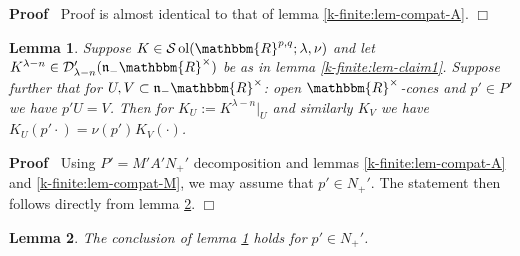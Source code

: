 \documentclass{article}
\newcommand{\assign}{:=}
\newcommand{\tmop}[1]{\ensuremath{\operatorname{#1}}}
\newenvironment{proof}{\noindent\textbf{Proof\ }}{\hspace*{\fill}$\Box$\medskip}
\numberwithin{definition}{section}
\newtheorem{lemma}{Lemma}
\numberwithin{lemma}{section}
\numberwithin{proposition}{section}
{\theorembodyfont{\rmfamily}\newtheorem{remark}{Remark}
\numberwithin{remark}{section}
}
\begin{document}
\begin{proof}
  Proof is almost identical to that of lemma \ref{k-finite:lem-compat-A}.
\end{proof}

\begin{lemma}
  \label{k-finite:lem-compat}Suppose $K_{} \in \mathcal{S} \tmop{ol} (
  \mathbbm{R}^{p, q} ; \lambda, \nu)$ and let $K^{\lambda - n} \in
  \mathcal{D}'_{\lambda - n} ( \mathfrak{n}_- \mathbbm{R}^{\times})$ be as in
  lemma \ref{k-finite:lem-claim1}. Suppose further that for $U, V \subset
  \mathfrak{n}_- \mathbbm{R}^{\times}$: open $\mathbbm{R}^{\times}$-cones and
  $p' \in P'$ we have $p' U = V$. Then for $K_U \assign K^{\lambda - n} |_U$
  and similarly $K_V$ we have $K_U ( p' \cdot) = \nu ( p')^{} K_V ( \cdot)$.
\end{lemma}

\begin{proof}
  Using $P' = M' A' N_+'$ decomposition and lemmas \ref{k-finite:lem-compat-A}
  and \ref{k-finite:lem-compat-M}, we may assume that $p' \in N_+'$. The
  statement then follows directly from lemma \ref{k-finite:lem-compat-N}.
\end{proof}

\begin{lemma}
  \label{k-finite:lem-compat-N}The conclusion of lemma
  \ref{k-finite:lem-compat} holds for $p' \in N_+'$.
\end{lemma}
\end{document}
